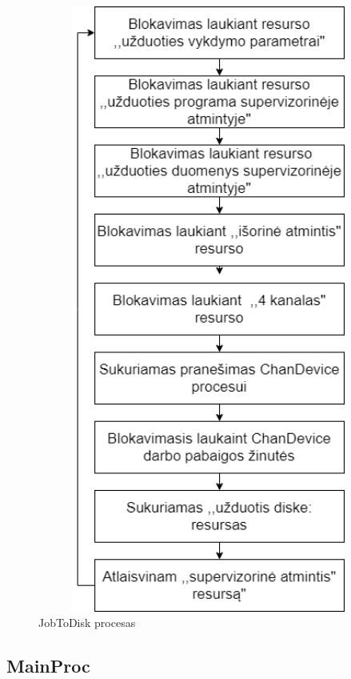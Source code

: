 \documentclass[oneside]{VUMIFPSkursinis}
\begin{document}
\begin{figure}[H]
		\centering	
	\includegraphics[width=18cm,height=20cm,keepaspectratio]{JobToDisk.png}
	\caption{JobToDisk procesas}
	\label{fig:JobToDisk procesas}
\end{figure}

\subsection{MainProc}
\end{document}
